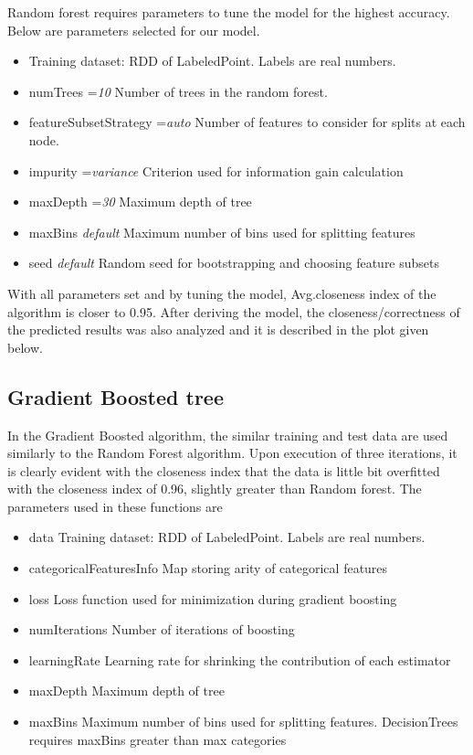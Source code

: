 \documentclass[sigconf]{acmart}
\begin{document}
Random forest requires parameters to tune the model for the highest accuracy. Below are parameters selected for our model.
\begin{itemize}
\item Training dataset: RDD of LabeledPoint. Labels are real numbers.
\item numTrees ={\em 10}   Number of trees in the random forest.
\item featureSubsetStrategy ={\em auto}   Number of features to consider for splits at each node.
\item impurity ={\em variance }  Criterion used for information gain calculation 
\item maxDepth ={\em 30 }  Maximum depth of tree
\item maxBins {\em default }   Maximum number of bins used for splitting features
\item seed {\em default }   Random seed for bootstrapping and choosing feature subsets
\end{itemize}

With all parameters set and by tuning the model, Avg.closeness index of the algorithm is closer to 0.95. After deriving the model, the closeness/correctness of the predicted results was also analyzed and it is described in the plot given below.

\subsection{Gradient Boosted tree}
In the Gradient Boosted algorithm, the similar training and test data are used similarly to the Random Forest algorithm. Upon execution of three iterations, it is clearly evident with the closeness index that the data is little bit overfitted with the closeness index of 0.96, slightly greater than Random forest.
The parameters used in these functions are 
\begin{itemize}
\item data  Training dataset: RDD of LabeledPoint. Labels are real numbers.
\item categoricalFeaturesInfo  Map storing arity of categorical features
\item loss  Loss function used for minimization during gradient boosting
\item numIterations  Number of iterations of boosting
\item learningRate  Learning rate for shrinking the contribution of each estimator
\item maxDepth  Maximum depth of tree 
\item maxBins  Maximum number of bins used for splitting features. DecisionTrees requires maxBins greater than max categories
\end{itemize}
\end{document}
